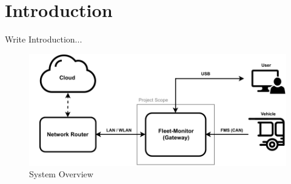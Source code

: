 \newcommand{\package}{\emph}

\chapter{Introduction}
Write Introduction...




\bigskip
\begin{figure}[h!]
	\centering
	\includegraphics[width=\textwidth]{images/System_Overview}
	\vspace{-0.3cm}
	\caption{System Overview}
	\label{fig:system-overview}
\end{figure}
